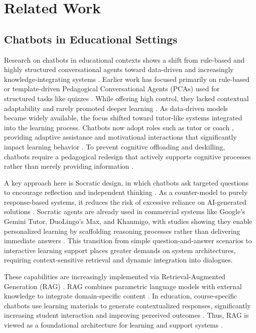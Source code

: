 \section{Related Work}

\subsection{Chatbots in Educational Settings}
Research on chatbots in educational contexts shows a shift from rule-based and highly structured conversational agents toward data-driven and increasingly knowledge-integrating systems \autocite{Waldner2022, Chen2025,Klesel2025}. Earlier work has focused primarily on rule-based or template-driven Pedagogical Conversational Agents (PCAs) used for structured tasks like quizzes \autocite{Waldner2022}. While offering high control, they lacked contextual adaptability and rarely promoted deeper learning \autocite{Waldner2022}. As data-driven models became widely available, the focus shifted toward tutor-like systems integrated into the learning process. Chatbots now adopt roles such as tutor \autocite{KhosrawiRad2024} or coach \autocite{Chen2022}, providing adaptive assistance and motivational interactions that significantly impact learning behavior \autocite{Schlimbach2023, KhosrawiRad2024}. To prevent cognitive offloading and deskilling, chatbots require a pedagogical redesign that actively supports cognitive processes rather than merely providing information \autocite{soc15010006}.

A key approach here is Socratic design, in which chatbots ask targeted questions to encourage reflection and independent thinking \autocite{socaraticChatbot}. As a counter-model to purely response-based systems, it reduces the risk of excessive reliance on AI-generated solutions \autocite{Ma2024}. Socratic agents are already used in commercial systems like Google's Gemini Tutor, DuoLingo's Max, and Khanmigo, with studies showing they enable personalized learning by scaffolding reasoning processes rather than delivering immediate answers \autocite{Shetye2024Khanmigo}. This transition from simple question-and-answer scenarios to interactive learning support places greater demands on system architectures, requiring context-sensitive retrieval and dynamic integration into dialogues.

These capabilities are increasingly implemented via Retrieval-Augmented Generation (RAG) \autocite{zhaoragSurvey}. RAG combines parametric language models with external knowledge to integrate domain-specific content \autocite{Lewis2020_RAG}. In education, course-specific chatbots use learning materials to generate contextualized responses, significantly increasing student interaction and improving perceived outcomes \autocite{Chen2025}. Thus, RAG is viewed as a foundational architecture for learning and support systems \autocite{Klesel2025,Chen2025}.

